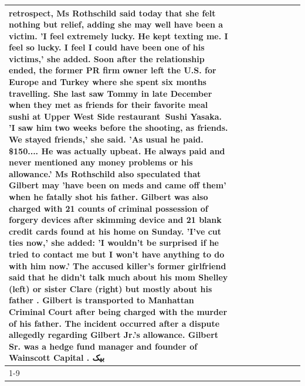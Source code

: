 \begin{table}[H]
\begin{tabular}{lllrlllll}
retrospect, Ms Rothschild said today that she felt nothing but relief, adding she may well have been a victim. 'I feel extremely lucky. He kept texting me. I feel so lucky. I feel I could have been one of his victims,' she added. Soon after the relationship ended, the former PR firm owner left the U.S. for Europe and Turkey where she spent six months  travelling. She last saw Tommy in late December when they met as friends for their favorite meal sushi at Upper West Side restaurant Sushi Yasaka. 'I saw him two weeks before the shooting, as friends. We stayed friends,' she said. 'As usual he paid. \$150.... He was actually upbeat. He always paid and never mentioned any money problems or his allowance.' Ms Rothschild also speculated that Gilbert may 'have been on meds and came off them' when he fatally shot his father. Gilbert was also charged with 21 counts of criminal possession of forgery devices after skimming device and 21 blank credit cards found at his home on Sunday. 'I've cut ties now,' she added: 'I wouldn’t be surprised if he tried to contact me but I won’t have anything to do with him now.' The accused killer's former girlfriend said that he didn't talk much about his mom Shelley (left) or sister Clare (right) but mostly about his father . Gilbert is transported to Manhattan Criminal Court  after being charged with the murder of his father. The incident occurred after a dispute allegedly regarding Gilbert Jr.'s allowance. Gilbert Sr. was a hedge fund manager and founder of Wainscott Capital . بیک \\
\cline{1-9}
\bottomrule
\end{tabular}
\end{table}

